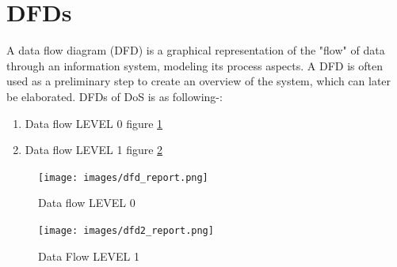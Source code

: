 \section{DFDs}                                                          
A data flow diagram (DFD) is a graphical representation of the "flow" of data through an information system, modeling its process aspects. A DFD is often used as a      preliminary step to create an overview of the system, which can later be elaborated. DFDs of DoS is as following-:
\begin{enumerate}                                                       
\item Data flow LEVEL 0 figure \ref{fig:DFDs}                           
\item Data flow LEVEL 1 figure \ref{fig:DFDs1}                          
\end{enumerate}                                                         
                                                                        
\begin{figure}[H]                                                       
\centering \texttt{[image: images/dfd\_report.png]}                 
\caption{Data flow LEVEL 0}                                             
\label{fig:DFDs}                                                        
\end{figure}                                                            
\begin{figure}[H]                                                       
\centering \texttt{[image: images/dfd2\_report.png]}               
\caption{Data Flow LEVEL 1}                                             
\label{fig:DFDs1}                                                       
\end{figure} 


